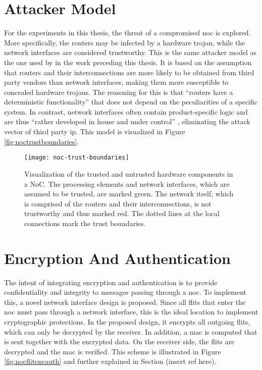 \section{Attacker Model}
For the experiments in this thesis, the threat of a compromised \gls{noc} is explored. More specifically, the routers may be infected by a hardware
trojan, while the network interfaces are considered trustworthy. This is the same attacker model as the one used by \citeauthor{moriam18activeattackers}
\cite{moriam18activeattackers} in the work preceding this thesis. It is based on the assumption that routers and their interconnections are
more likely to be obtained from third party vendors than network interfaces, making them more susceptible to concealed hardware trojans. The reasoning
for this is that \enquote{routers have a deterministic functionality} \cite[2]{moriam18activeattackers} that does not depend on the peculiarities of
a specific system. In contrast, network interfaces often contain product-specific logic and are thus \enquote{rather developed in house and under
control} \cite[2]{moriam18activeattackers}, eliminating the attack vector of third party \gls{ip}. This model is visualized in Figure
\vref{fig:noctrustboundaries}.

\begin{figure}
    \centering
    \texttt{[image: noc-trust-boundaries]}
    \caption[Trust boundaries in a NoC]{Visualization of the trusted and untrusted hardware components in a NoC. The processing elements and network
    interfaces, which are assumed to be trusted, are marked green. The network itself, which is comprised of the routers and their interconnections,
    is not trustworthy and thus marked red. The dotted lines at the local connections mark the trust boundaries.}
    \label{fig:noctrustboundaries}
\end{figure}

\section{Encryption And Authentication}\label{sec:encandauth}
The intent of integrating encryption and authentication is to provide confidentiality and integrity to messages passing through a \gls{noc}. To
implement this, a novel network interface design is proposed. Since all flits that enter the \gls{noc} must pass through a network interface, this is the
ideal location to implement cryptographic protections. In the proposed design, it encrypts all outgoing flits, which can only be decrypted by the
receiver. In addition, a \gls{mac} is computed that is sent together with the encrypted data. On the receiver side, the flits are decrypted and the
\gls{mac} is verified. This scheme is illustrated in Figure \vref{fig:nocflitencauth} and further explained in Section (insert ref here).


